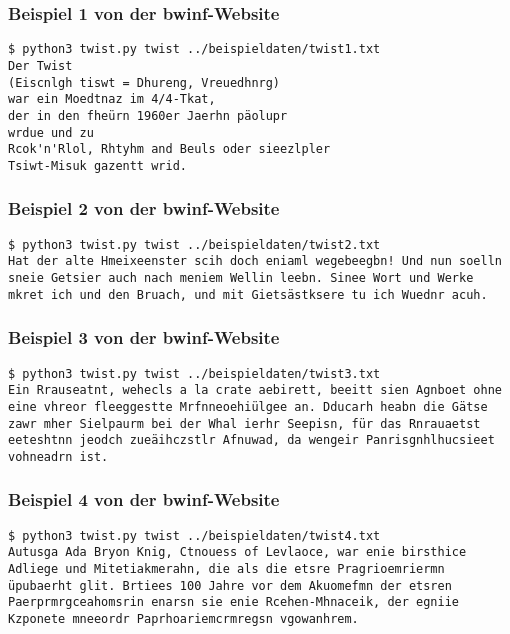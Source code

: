 \documentclass[a4paper,10pt,ngerman]{scrartcl}
\begin{document}
\subsubsection{Beispiel 1 von der bwinf-Website}
\label{beispiel:twisten:1}
\begin{lstlisting}[breaklines=true]
$ python3 twist.py twist ../beispieldaten/twist1.txt 
Der Twist  
(Eiscnlgh tiswt = Dhureng, Vreuedhnrg)  
war ein Moedtnaz im 4/4-Tkat,  
der in den fheürn 1960er Jaerhn päolupr  
wrdue und zu  
Rcok'n'Rlol, Rhtyhm and Beuls oder sieezlpler 
Tsiwt-Misuk gazentt wrid.
\end{lstlisting}


\subsubsection{Beispiel 2 von der bwinf-Website}
\label{beispiel:twisten:2}
\begin{lstlisting}[breaklines=true]
$ python3 twist.py twist ../beispieldaten/twist2.txt 
Hat der alte Hmeixeenster scih doch eniaml wegebeegbn! Und nun soelln sneie Getsier auch nach meniem Wellin leebn. Sinee Wort und Werke mkret ich und den Bruach, und mit Gietsästksere tu ich Wuednr acuh.
\end{lstlisting}


\subsubsection{Beispiel 3 von der bwinf-Website}
\label{beispiel:twisten:3}
\begin{lstlisting}[breaklines=true]
$ python3 twist.py twist ../beispieldaten/twist3.txt 
Ein Rrauseatnt, wehecls a la crate aebirett, beeitt sien Agnboet ohne eine vhreor fleeggestte Mrfnneoehiülgee an. Dducarh heabn die Gätse zawr mher Sielpaurm bei der Whal ierhr Seepisn, für das Rnrauaetst eeteshtnn jeodch zueäihczstlr Afnuwad, da wengeir Panrisgnhlhucsieet vohneadrn ist.
\end{lstlisting}


\subsubsection{Beispiel 4 von der bwinf-Website}
\label{beispiel:twisten:4}
\begin{lstlisting}[breaklines=true]
$ python3 twist.py twist ../beispieldaten/twist4.txt 
Autusga Ada Bryon Knig, Ctnouess of Levlaoce, war enie birsthice Adliege und Mitetiakmerahn, die als die etsre Pragrioemriermn üpubaerht glit. Brtiees 100 Jahre vor dem Akuomefmn der etsren Paerprmrgceahomsrin enarsn sie enie Rcehen-Mhnaceik, der egniie Kzponete mneeordr Paprhoariemcrmregsn vgowanhrem.
\end{lstlisting}
\end{document}
